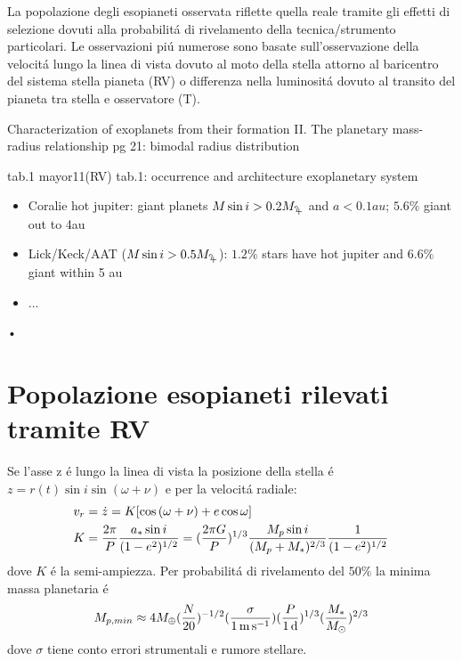 La popolazione degli esopianeti osservata riflette quella reale tramite gli effetti di selezione dovuti alla probabilit\'a di rivelamento della tecnica/strumento particolari. Le osservazioni pi\'u numerose sono basate sull'osservazione della velocit\'a lungo la linea di vista dovuto al moto della stella attorno al baricentro del sistema stella pianeta (RV) o differenza nella luminosit\'a dovuto al transito del pianeta tra stella e osservatore (T).

\begin{workout}
Characterization of exoplanets from their formation II. The planetary mass-radius relationship pg 21: bimodal radius distribution
\end{workout}

\begin{workout}
tab.1 mayor11(RV)
tab.1: occurrence and architecture exoplanetary system 
\end{workout}

\begin{workout}
\begin{itemize}
\item Coralie hot jupiter: giant planets $M\sin{i}>0.2\mjupiter$ and $a<0.1au$; $5.6\%$ giant out to 4au
\item Lick/Keck/AAT ($M\sin{i}>0.5\mjupiter$): $1.2\%$ stars have hot jupiter and $6.6\%$ giant within 5 au
\item ...
\end{itemize}•
\end{workout}

\section{Popolazione esopianeti rilevati tramite RV}

Se l'asse z \'e lungo la linea di vista la posizione della stella \'e $z=r(t)\sin{i}\sin{(\omega+\nu)}$ e per la velocit\'a radiale:
\begin{align}
&v_r=\dot{z}=K[\cos{(\omega+\nu)}+e\cos{\omega}]\label{eq:vrsignal}\\
&K=\frac{2\pi}{P}\frac{a_*\sin{i}}{(1-e^2)^{1/2}}=(\frac{2\pi G}{P})^{1/3}\frac{M_p\sin{i}}{(M_p+M_*)^{2/3}}\frac{1}{(1-e^2)^{1/2}}
\end{align}
dove $K$ \'e la semi-ampiezza.
Per probabilit\'a di rivelamento del $50\%$ la minima massa planetaria \'e
\begin{equation}
M_{p,min}\approx4\mearth{}(\frac{N}{20})\expy{-1/2}(\frac{\sigma}{\SI{1}{\meter\per\second}})(\frac{P}{\SI{1}{\day}})\expy{1/3}(\frac{M_*}{\msun{}})\expy{2/3}
\end{equation}
dove $\sigma$ tiene conto errori strumentali e rumore stellare.

